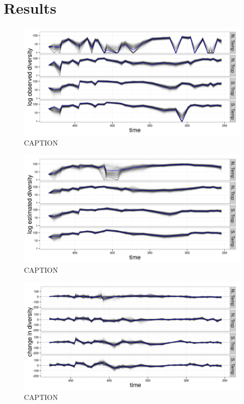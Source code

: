 \documentclass[12pt,letterpaper]{article}
\begin{document}
\section{Results}

\begin{figure}[ht]
  \centering
  \includegraphics[width=\textwidth,height=0.5\textheight,keepaspectratio=true]{figure/obs_div}
  \caption{CAPTION}
  \label{fig:fit}
\end{figure}

\begin{figure}[ht]
  \centering
  \includegraphics[width=\textwidth,height=0.5\textheight,keepaspectratio=true]{figure/true_div}
  \caption{CAPTION}
  \label{fig:true}
\end{figure}

\begin{figure}[ht]
  \centering
  \includegraphics[width=\textwidth,height=0.5\textheight,keepaspectratio=true]{figure/est_diff}
  \caption{CAPTION}
  \label{fig:rel}
\end{figure}
\end{document}
